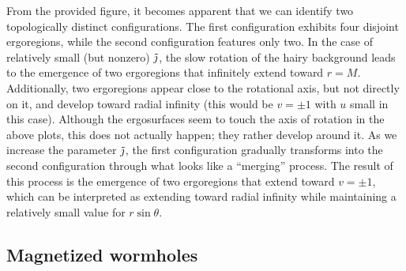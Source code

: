 \documentclass[aps,preprint,groupedaddress,nofootinbib,superscriptaddress,showkeys,showpacs,eqsecnum,amsmath,amssymb]{revtex4-1}
\begin{document}
From the provided figure, it becomes apparent that we can identify two topologically distinct configurations. The first configuration exhibits four disjoint ergoregions, while the second configuration features only two. In the case of relatively small (but nonzero) $\Tilde{\jmath}$, the slow rotation of the hairy background leads to the emergence of two ergoregions that infinitely extend toward $r=M$. Additionally, two ergoregions appear close to the rotational axis, but not directly on it, and develop toward radial infinity (this would be $v=\pm 1$ with $u$ small in this case). Although the ergosurfaces seem to touch the axis of rotation in the above plots, this does not actually happen; they rather develop around it. As we increase the parameter $\Tilde{\jmath}$, the first configuration gradually transforms into the second configuration through what looks like a ``merging'' process. The result of this process is the emergence of two ergoregions that extend toward $v=\pm 1$, which can be interpreted as extending toward radial infinity while maintaining a relatively small value for $r\sin\theta$.

\subsection{Magnetized wormholes}
\end{document}
